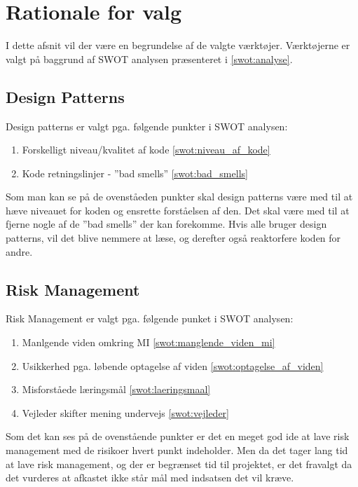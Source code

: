\section{Rationale for valg}
I dette afsnit vil der være en begrundelse af de valgte værktøjer.
Værktøjerne er valgt på baggrund af SWOT analysen præsenteret i \cref{swot:analyse}.

\subsection{Design Patterns}
Design patterns er valgt pga. følgende punkter i SWOT analysen:
\begin{enumerate}
\item Forskelligt niveau/kvalitet af kode \cref{swot:niveau_af_kode}
\item Kode retningslinjer - ''bad smells'' \cref{swot:bad_smells}
\end{enumerate}

Som man kan se på de ovenståeden punkter skal design patterns være med til at hæve niveauet for koden og ensrette forståelsen af den.
Det skal være med til at fjerne nogle af de ''bad smells'' der kan forekomme.
Hvis alle bruger design patterns, vil det blive nemmere at læse, og derefter også reaktorfere koden for andre.

\subsection{Risk Management}
Risk Management er valgt pga. følgende punket i SWOT analysen:

\begin{enumerate}
\item Manlgende viden omkring MI \cref{swot:manglende_viden_mi}
\item Usikkerhed pga. løbende optagelse af viden \cref{swot:optagelse_af_viden}
\item Misforståede læringsmål \cref{swot:laeringsmaal}
\item Vejleder skifter mening undervejs \cref{swot:vejleder}
\end{enumerate}

Som det kan ses på de ovenstående punkter er det en meget god ide at lave risk management med de risikoer hvert punkt indeholder.
Men da det tager lang tid at lave risk management, og der er begrænset tid til projektet, er det fravalgt da det vurderes at afkastet ikke står mål med indsatsen det vil kræve.